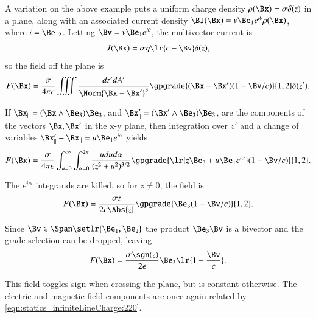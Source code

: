 %
%
A variation on the above example puts a uniform charge density \( \rho(\Bx) = \sigma \delta(z) \) in a plane, along with an associated current density \( \BJ(\Bx) = v \Be_1 e^{i\theta} \rho(\Bx) \), where \( i = \Be_{12} \).  Letting \( \Bv = v \Be_1 e^{i\theta} \), the multivector current is
\begin{equation}\label{eqn:statics_infinitePlane:240}
J(\Bx) = \sigma \eta \lr{ c - \Bv } \delta(z),
\end{equation}
so the field off the plane is
\begin{equation}\label{eqn:statics_infinitePlane:260}
F(\Bx) = \frac{\sigma}{4 \pi \epsilon } \iiint \frac{dz' dA'}{ \Norm{ \Bx - \Bx' }^3 } \gpgrade{ (\Bx - \Bx') (1 - \Bv/c) }{1,2} \delta(z').
\end{equation}

If \( \Bx_\parallel = (\Bx \wedge \Be_3) \Be_3 \), and \( \Bx'_\parallel = (\Bx' \wedge \Be_3) \Be_3 \), are the components of the vectors \( \Bx, \Bx' \) in the x-y plane, then integration over \( z' \) and a change of variables \( \Bx'_\parallel - \Bx_\parallel = u \Be_1 e^{i \alpha} \) yields
\begin{equation}\label{eqn:statics_infinitePlane:280}
F(\Bx) = \frac{\sigma}{4 \pi \epsilon } \int_{u=0}^\infty\int_{\alpha=0}^{2\pi} \frac{u du d\alpha}{ ( z^2 + u^2 )^{3/2} } \gpgrade{ \lr{ z \Be_3 + u \Be_1 e^{i\alpha} } (1 - \Bv/c) }{1,2}.
\end{equation}

The \( e^{i\alpha} \) integrands are killed, so for \( z \ne 0 \), the field is
\begin{equation}\label{eqn:statics_infinitePlane:300}
F(\Bx) = \frac{\sigma z}{2 \epsilon \Abs{z} } \gpgrade{ \Be_3 (1 - \Bv/c) }{1,2}.
\end{equation}

Since \( \Bv \in \Span \setlr{ \Be_1, \Be_2 } \) the product \( \Be_3 \Bv \) is a bivector and the grade selection can be dropped, leaving
\begin{equation}\label{eqn:statics_infinitePlane:320}
F(\Bx) = \frac{\sigma \sgn(z)}{2 \epsilon } \Be_3 \lr{ 1 - \frac{\Bv}{c}}.
\end{equation}

This field toggles sign when crossing the plane, but is constant otherwise.  The electric and magnetic field components are once again related by \cref{eqn:statics_infiniteLineCharge:220}.

